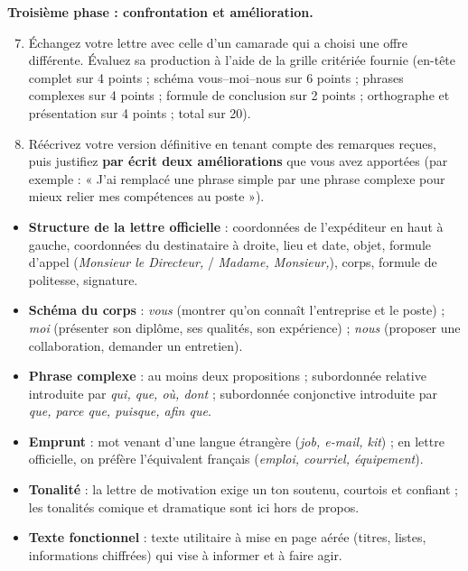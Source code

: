 \documentclass[11pt]{article}
\newcounter{popsec}
\newcounter{popsub}
\newcommand{\courssub}[1]{%
  \stepcounter{popsub}%
  \par\vspace{9pt}\noindent{\popxbold\fontsize{11.5}{13}\selectfont\color{popink}{\color{poporange}\thepopsec.\thepopsub}\hspace{6pt}#1}\par\nopagebreak\vspace{4pt}
}
\begin{document}
\textbf{Troisième phase : confrontation et amélioration.}

\begin{enumerate}
\setcounter{enumi}{6}
\item Échangez votre lettre avec celle d'un camarade qui a choisi une offre différente. Évaluez sa production à l'aide de la grille critériée fournie (en-tête complet sur 4 points ; schéma vous--moi--nous sur 6 points ; phrases complexes sur 4 points ; formule de conclusion sur 2 points ; orthographe et présentation sur 4 points ; total sur 20).
\item Réécrivez votre version définitive en tenant compte des remarques reçues, puis justifiez \textbf{par écrit deux améliorations} que vous avez apportées (par exemple : « J'ai remplacé une phrase simple par une phrase complexe pour mieux relier mes compétences au poste »).
\end{enumerate}

\courssub{Ressources à mobiliser}

\begin{aretenir}
\begin{itemize}
\item \textbf{Structure de la lettre officielle} : coordonnées de l'expéditeur en haut à gauche, coordonnées du destinataire à droite, lieu et date, objet, formule d'appel (\emph{Monsieur le Directeur,} / \emph{Madame, Monsieur,}), corps, formule de politesse, signature.
\item \textbf{Schéma du corps} : \emph{vous} (montrer qu'on connaît l'entreprise et le poste) ; \emph{moi} (présenter son diplôme, ses qualités, son expérience) ; \emph{nous} (proposer une collaboration, demander un entretien).
\item \textbf{Phrase complexe} : au moins deux propositions ; subordonnée relative introduite par \emph{qui, que, où, dont} ; subordonnée conjonctive introduite par \emph{que, parce que, puisque, afin que}.
\item \textbf{Emprunt} : mot venant d'une langue étrangère (\emph{job, e-mail, kit}) ; en lettre officielle, on préfère l'équivalent français (\emph{emploi, courriel, équipement}).
\item \textbf{Tonalité} : la lettre de motivation exige un ton soutenu, courtois et confiant ; les tonalités comique et dramatique sont ici hors de propos.
\item \textbf{Texte fonctionnel} : texte utilitaire à mise en page aérée (titres, listes, informations chiffrées) qui vise à informer et à faire agir.
\end{itemize}
\end{aretenir}
\end{document}
